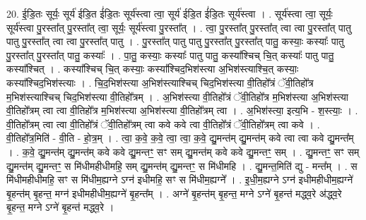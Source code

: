 \documentclass[17pt]{extarticle}
\begin{document}
20. ई॒डि॒तः सूर्यः॒ सूर्य॑ ईडि॒त ई॑डि॒तः सूर्य॑स्त्वा त्वा॒ सूर्य॑ ईडि॒त ई॑डि॒तः सूर्य॑स्त्वा । . सूर्य॑स्त्वा त्वा॒ सूर्यः॒ सूर्य॑स्त्वा पु॒रस्ता᳚त् पु॒रस्ता᳚त् त्वा॒ सूर्यः॒ सूर्य॑स्त्वा पु॒रस्ता᳚त् । . त्वा॒ पु॒रस्ता᳚त् पु॒रस्ता᳚त् त्वा त्वा पु॒रस्ता᳚त् पातु पातु पु॒रस्ता᳚त् त्वा त्वा पु॒रस्ता᳚त् पातु । . पु॒रस्ता᳚त् पातु पातु पु॒रस्ता᳚त् पु॒रस्ता᳚त् पातु॒ कस्याः॒ कस्याः᳚ पातु पु॒रस्ता᳚त् पु॒रस्ता᳚त् पातु॒ कस्याः᳚ । . पा॒तु॒ कस्याः॒ कस्याः᳚ पातु पातु॒ कस्या᳚श्चिच् चि॒त् कस्याः᳚ पातु पातु॒ कस्या᳚श्चित् । . कस्या᳚श्चिच् चि॒त् कस्याः॒ कस्या᳚श्चिद॒भिश॑स्त्या अ॒भिश॑स्त्याश्चि॒त् कस्याः॒ कस्या᳚श्चिद॒भिश॑स्त्याः । . चि॒द॒भिश॑स्त्या अ॒भिश॑स्त्याश्चिच् चिद॒भिश॑स्त्या वी॒तिहो᳚त्रं ॅवी॒तिहो᳚त्र म॒भिश॑स्त्याश्चिच् चिद॒भिश॑स्त्या वी॒तिहो᳚त्रम् । . अ॒भिश॑स्त्या वी॒तिहो᳚त्रं ॅवी॒तिहो᳚त्र म॒भिश॑स्त्या अ॒भिश॑स्त्या वी॒तिहो᳚त्रम् त्वा त्वा वी॒तिहो᳚त्र म॒भिश॑स्त्या अ॒भिश॑स्त्या वी॒तिहो᳚त्रम् त्वा । . अ॒भिश॑स्त्या॒ इत्य॒भि - श॒स्त्याः॒ । . वी॒तिहो᳚त्रम् त्वा त्वा वी॒तिहो᳚त्रं ॅवी॒तिहो᳚त्रम् त्वा कवे कवे त्वा वी॒तिहो᳚त्रं ॅवी॒तिहो᳚त्रम् त्वा कवे । . वी॒तिहो᳚त्र॒मिति॑ - वी॒ति - हो॒त्र॒म् । . त्वा॒ क॒वे॒ क॒वे॒ त्वा॒ त्वा॒ क॒वे॒ द्यु॒मन्त॑म् द्यु॒मन्त॑म् कवे त्वा त्वा कवे द्यु॒मन्त᳚म् । . क॒वे॒ द्यु॒मन्त॑म् द्यु॒मन्त॑म् कवे कवे द्यु॒मन्तꣳ॒॒ सꣳ सम् द्यु॒मन्त॑म् कवे कवे द्यु॒मन्तꣳ॒॒ सम् । . द्यु॒मन्तꣳ॒॒ सꣳ सम् द्यु॒मन्त॑म् द्यु॒मन्तꣳ॒॒ स मि॑धीमहीधीमहि॒ सम् द्यु॒मन्त॑म् द्यु॒मन्तꣳ॒॒ स मि॑धीमहि । . द्यु॒मन्त॒मिति॑ द्यु - मन्त᳚म् । . स मि॑धीमहीधीमहि॒ सꣳ स मि॑धीम॒ह्यग्ने ऽग्न॑ इधीमहि॒ सꣳ स मि॑धीम॒ह्यग्ने᳚ । . इ॒धी॒म॒ह्यग्ने ऽग्न॑ इधीमहीधीम॒ह्यग्ने॑ बृ॒हन्त॑म् बृ॒हन्त॒ मग्न॑ इधीमहीधीम॒ह्यग्ने॑ बृ॒हन्त᳚म् । . अग्ने॑ बृ॒हन्त॑म् बृ॒हन्त॒ मग्ने ऽग्ने॑ बृ॒हन्त॑ मद्ध्व॒रे अ॑द्ध्व॒रे बृ॒हन्त॒ मग्ने ऽग्ने॑ बृ॒हन्त॑ मद्ध्व॒रे । \newline
\end{document}
